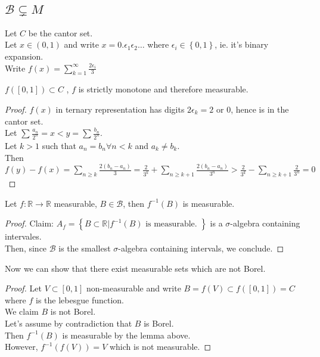 \documentclass[../main.tex]{subfiles}
\begin{document}
\subsection{$ \mathcal{B} \subsetneq M$ }
Let $C$ be the cantor set.\\
Let $x\in ( 0,1) $ and write $x= 0.\epsilon_1\epsilon_2\ldots$ where $\epsilon_i \in \left\{ 0,1 \right\} $, ie. it's binary expansion.\\
Write $f( x) = \sum_{k=1}^{ \infty } \frac{2 \epsilon_i}{3}$
\begin{lemma}
$f( [ 0,1] ) \subset C$ , $f$ is strictly monotone and therefore measurable.
\end{lemma}
\begin{proof}
$f( x) $ in ternary representation has digits $2\epsilon_k = 2$ or $0$, hence is in the cantor set.\\
Let $ \sum_{}^{ } \frac{a_n}{2^{n}}=x<y= \sum_{}^{ } \frac{b_n}{2^{n}}$.\\
Let $k>1$ such that $a_n=b_n\forall n <k$ and $a_k \neq b_k$.\\
Then $f( y) - f( x) = \sum_{ n \geq k}  \frac{2( b_n-a_n )}{3}= \frac{2}{3^{k}} + \sum_{ n \geq k+1 }^{ } \frac{2( b_n-a_n) }{3^{n}}> \frac{2}{3^{k}} - \sum_{ n \geq k+1}^{ } \frac{2}{3^{n}} = 0$ 
\end{proof}
\begin{lemma}
Let $f: \mathbb{R}\to \mathbb{R}$ measurable, $B\in \mathcal{B}$, then $f^{-1}( B) $ is measurable.
\end{lemma}
\begin{proof}
Claim: $A_f = \left\{ B \subset \mathbb{R} | f^{-1}( B) \text{ is measurable. }  \right\} $ is a $\sigma$-algebra containing intervales.\\
Then, since $ \mathcal{B}$ is the smallest $\sigma$-algebra containing intervals, we conclude.
\end{proof}
Now we can show that there exist measurable sets which are not Borel.
\begin{proof}
Let $V \subset [ 0,1] $ non-measurable and write $B= f( V) \subset f( [ 0,1] ) = C $ where $f$ is the lebesgue function.\\
We claim $B$ is not Borel.\\
Let's assume by contradiction that $B$ is Borel.\\
Then $f^{-1}( B) $ is measurable by the lemma above.\\
However, $f^{-1}( f( V) ) =V$ which is not measurable.
\end{proof}
\end{document}
